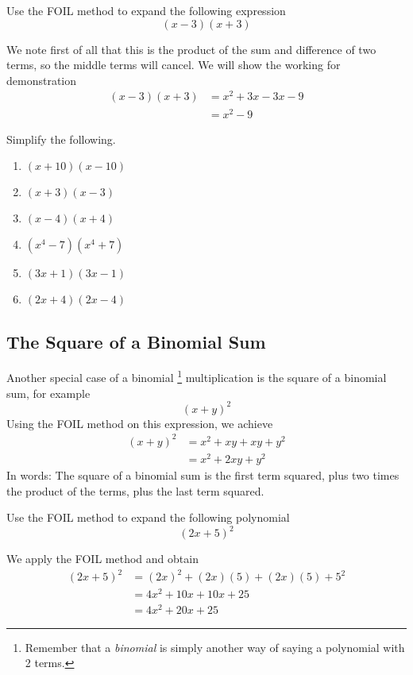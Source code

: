 \begin{myexample}\label{ex:sumdiff}
Use the FOIL method to expand the following \gls{expression}
\[
	(x-3)(x+3)
\]
\end{myexample}
\begin{myProof}
	We note first of all that this is the product of the sum and difference of two terms, so the middle terms will cancel. We will show the
	working for demonstration
	\begin{align*}
		(x-3)(x+3) & =		x^2+3x-3x-9 \\
		           & =		x^2-9       
	\end{align*} 
\end{myProof} 

\begin{myexample}
Simplify the following.
\drillandskill
\end{myexample}
\begin{enumerate}
	\item $(x+10)(x-10)$
	\item $(x+3)(x-3)$
	\item $(x-4)(x+4)$
	\item $(x^4-7)(x^4+7)$
	\item $(3x+1)(3x-1)$
	\item $(2x+4)(2x-4)$
\end{enumerate}

\subsection{The Square of a Binomial Sum}\label{sec:binsum}
Another special case of a binomial \footnote{ Remember that a {\em binomial} is simply another way of saying a polynomial with 2 terms.} 
multiplication is the square of a binomial sum, for example
\[
	(x+y)^2
\] 
Using the FOIL method on this expression, we achieve
\begin{align*}
	(x+y)^2 & =		x^2+xy+xy+y^2 \\
	        & =		x^2+2xy+y^2   
\end{align*} 
In words: The square of a binomial sum is the first term squared, plus two times the product of the terms, plus the last term squared.

\begin{myexample}
Use the FOIL method to expand the following polynomial 
\[
	(2x+5)^2
\]
\end{myexample}
\begin{myProof}
	We apply the FOIL method and obtain
	\begin{align*}
		(2x+5)^2 & =		(2x)^2+(2x)(5)+(2x)(5)+5^2 \\
		         & =		4x^2+10x+10x+25            \\
		         & =		4x^2+20x+25                
	\end{align*} 
\end{myProof} 

